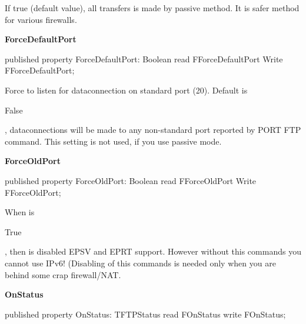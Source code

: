 \documentclass{report}
\newif\ifpdf
\begin{document}
\begin{list}{}
\begin{flushleft}
\ifpdf
\end{flushleft}
\fi


\par If true (default value), all transfers is made by passive method. It is safer method for various firewalls.\label{ftpsend.TFTPSend-ForceDefaultPort}
\item[\textbf{ForceDefaultPort}\hfill]
\ifpdf
\begin{flushleft}
\fi
\begin{ttfamily}
published property ForceDefaultPort: Boolean read FForceDefaultPort Write FForceDefaultPort;\end{ttfamily}

\ifpdf
\end{flushleft}
\fi


\par Force to listen for dataconnection on standard port (20). Default is \begin{ttfamily}False\end{ttfamily}, dataconnections will be made to any non{-}standard port reported by PORT FTP command. This setting is not used, if you use passive mode.\label{ftpsend.TFTPSend-ForceOldPort}
\item[\textbf{ForceOldPort}\hfill]
\ifpdf
\begin{flushleft}
\fi
\begin{ttfamily}
published property ForceOldPort: Boolean read FForceOldPort Write FForceOldPort;\end{ttfamily}

\ifpdf
\end{flushleft}
\fi


\par When is \begin{ttfamily}True\end{ttfamily}, then is disabled EPSV and EPRT support. However without this commands you cannot use IPv6! (Disabling of this commands is needed only when you are behind some crap firewall/NAT.\label{ftpsend.TFTPSend-OnStatus}
\item[\textbf{OnStatus}\hfill]
\ifpdf
\begin{flushleft}
\fi
\begin{ttfamily}
published property OnStatus: TFTPStatus read FOnStatus write FOnStatus;\end{ttfamily}

\ifpdf
\end{flushleft}
\fi



\end{list}
\end{document}
